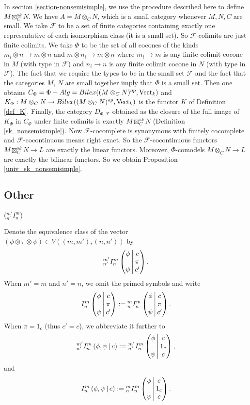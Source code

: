 In section \ref{section-nonsemisimple}, we use the procedure described here to define $M\boxtimes_C^{sk}N$. We have $A=M\otimes_C N$, which is a small category whenever $M,N,C$ are small. We take $\mathcal{F}$ to be a set of finite categories containing exactly one representative of each isomorphism class (it is a small set). So $\mathcal{F}$-colimits are just finite colimits. We take $\Phi$ to be the set of all cocones of the kinds $m_i\otimes n\to m\otimes n$ and $m\otimes n_i\to m\otimes n$ where $m_i\to m$ is any finite colimit cocone in $M$ (with type in $\mathcal{F}$) and $n_i\to n$ is any finite colimit cocone in $N$ (with type in $\mathcal{F}$). The fact that we require the types to be in the small set $\mathcal{F}$ and the fact that the categories $M$, $N$ are small together imply that $\Phi$ is a small set.  Then one obtains $C_{\Phi}=\Phi-Alg=Bilex((M\otimes_C N)^{op},\operatorname{Vect}_k)$ and $K_{\Phi}:M\otimes_C N\to Bilex((M\otimes_C N)^{op},\operatorname{Vect}_k)$ is the functor $K$ of Definition \ref{def_K}. Finally, the category $D_{\Phi,\mathcal{F}}$ obtained as the closure of the full image of $K_{\Phi}$ in $C_{\Phi}$ under finite colimits is exactly $M\boxtimes_C^{sk}N$ (Definition \ref{sk_nonsemisimple}). Now $\mathcal{F}$-cocomplete is synonymous with finitely cocomplete and $\mathcal{F}$-cocontinuous means right exact. So the $\mathcal{F}$-cocontinuous functors $M\boxtimes_C^{sk}N\to L$ are exactly the linear functors. Moreover, $\Phi$-comodels $M\otimes_C N\to L$ are exactly the bilinear functors. So we obtain Proposition \ref{univ_sk_nonsemisimple}.




\subsection{Other}

\begin{notation} (${}^{m'}_{n'}I^{m}_{n}$)

  \noindent Denote the equivalence class of the vector
  $(\phi \otimes \pi \otimes \psi) \in V((m,m'),(n,n'))$ by
  \[{}^{m'}_{n'} I^{m}_{n} \left( \begin{matrix} \phi \\ {}\\ \psi \end{matrix} \,\middle|\, \begin{matrix} c \\ \pi \\ c' \end{matrix} \right).\]
  When $m' = m$ and $n' = n$, we omit the primed symbols and write
  \[
    {}^{}_{} I^{m}_{n} \left( \begin{matrix} \phi \\ {}\\ \psi \end{matrix} \,\middle|\, \begin{matrix} c \\ \pi \\ c' \end{matrix} \right) :=
    {}^{m}_{n} I^{m}_{n} \left( \begin{matrix} \phi \\ {}\\ \psi \end{matrix} \,\middle|\, \begin{matrix} c \\ \pi \\ c' \end{matrix} \right).
  \]
  When $\pi = 1_{c}$ (thus $c' = c$), we abbreviate it further to
  \[
    {}^{m'}_{n'} I^{m}_{n} \left( \phi, \psi \,\middle|\, c \right) :=
    {}^{m'}_{n'} I^{m}_{n} \left( \begin{matrix} \phi \\ {}\\ \psi \end{matrix} \,\middle|\, \begin{matrix} c \\ 1_{c} \\ c \end{matrix} \right),
  \]
  and
  \[
    {}^{}_{} I^{m}_{n} \left( \phi, \psi \,\middle|\, c \right) :=
    {}^{m}_{n} I^{m}_{n} \left( \begin{matrix} \phi \\ {}\\ \psi \end{matrix} \,\middle|\, \begin{matrix} c \\ 1_{c} \\ c \end{matrix} \right).
  \]
\end{notation}

